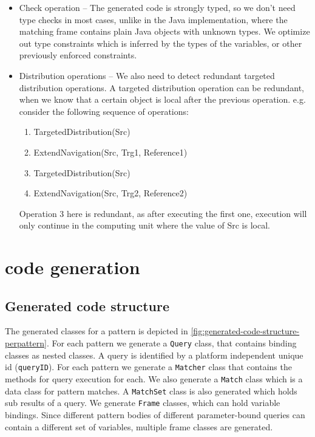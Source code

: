\begin{itemize}
	\item Check operation -- The generated code is strongly typed, so we don't need type checks in most cases, unlike in the Java implementation, where the matching frame contains plain Java objects with unknown types. We optimize out type constraints which is inferred by the types of the variables, or other previously enforced constraints.
	
	\item Distribution operations -- We also need to detect redundant targeted distribution operations. A targeted distribution operation can be redundant,  when we know that a certain object is local after the previous operation. e.g. consider the following sequence of operations:
	\begin{enumerate}
		\item TargetedDistribution(Src)
		\item ExtendNavigation(Src, Trg1, Reference1)
		\begingroup\color{red} 
		\item TargetedDistribution(Src)
		\endgroup
		\item ExtendNavigation(Src, Trg2, Reference2)
	\end{enumerate}
	Operation 3 here is redundant, as after executing the first one, execution will only continue in the computing unit where the value of Src is local.
	
\end{itemize}

\section{\protect\cpptt{} code generation}


\subsection{Generated code structure}

The generated classes for a pattern is depicted in \autoref{fig:generated-code-structure-perpattern}.
For each pattern we generate a \texttt{Query} class, that contains binding classes as nested classes. 
A query is identified by a platform independent unique id (\texttt{queryID}).
For each pattern we generate a \texttt{Matcher} class that contains the methods for query execution for each.
We also generate a \texttt{Match} class which is a data class for pattern matches.
A \texttt{MatchSet} class is also generated which holds sub results of a query.
We generate \texttt{Frame} classes, which can hold variable bindings. 
Since different pattern bodies of different parameter-bound queries can contain a different set of variables, multiple frame classes are generated.

